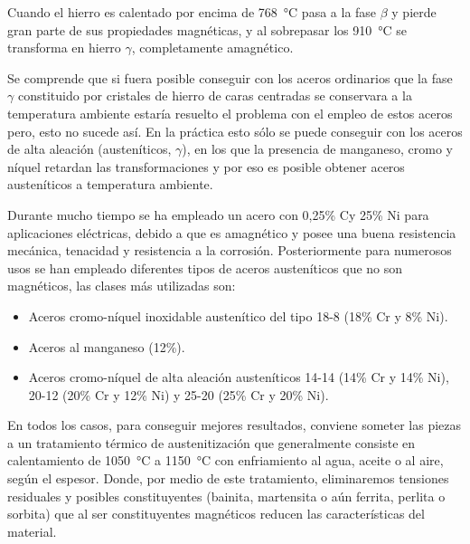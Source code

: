 \documentclass[12pt,a4paper]{article}
\begin{document}
Cuando el hierro es calentado por encima de \SI{768}{\celsius} pasa a la fase $\beta$ y pierde gran parte de sus propiedades magnéticas, y al sobrepasar los \SI{910}{\celsius} se transforma en hierro $\gamma$, completamente amagnético.

Se comprende que si fuera posible conseguir con los aceros ordinarios que la fase $\gamma$ constituido por cristales de hierro de caras centradas se conservara a la temperatura ambiente estaría resuelto el problema con el empleo de estos aceros pero, esto no sucede así. En la práctica esto sólo se puede conseguir con los aceros de alta aleación (austeníticos, $\gamma$), en los que la presencia de manganeso, cromo y níquel retardan las transformaciones y por eso es posible obtener aceros austeníticos a temperatura ambiente.

Durante mucho tiempo se ha empleado un acero con 0,25\% Cy 25\% Ni para aplicaciones eléctricas, debido a que es amagnético y posee una buena resistencia mecánica, tenacidad y resistencia a la corrosión. Posteriormente para numerosos usos se han empleado diferentes tipos de aceros austeníticos que no son magnéticos, las clases más utilizadas son: 

\begin{itemize}
    \item Aceros cromo-níquel inoxidable austenítico del tipo 18-8 (18\% Cr y 8\% Ni).
    \item Aceros al manganeso (12\%).
    \item Aceros cromo-níquel de alta aleación austeníticos 14-14 (14\% Cr y 14\% Ni), 20-12 (20\% Cr y 12\% Ni) y 25-20 (25\% Cr y 20\% Ni).
\end{itemize}

En todos los casos, para conseguir mejores resultados, conviene someter las piezas a un tratamiento térmico de austenitización que generalmente consiste en calentamiento de \SI{1 050}{\celsius} a \SI{1 150}{\celsius} con enfriamiento al agua, aceite o al aire, según el espesor. Donde, por medio de este tratamiento, eliminaremos tensiones residuales y posibles constituyentes (bainita, martensita o aún ferrita, perlita o sorbita) que al ser constituyentes magnéticos reducen las características del material.
\end{document}
